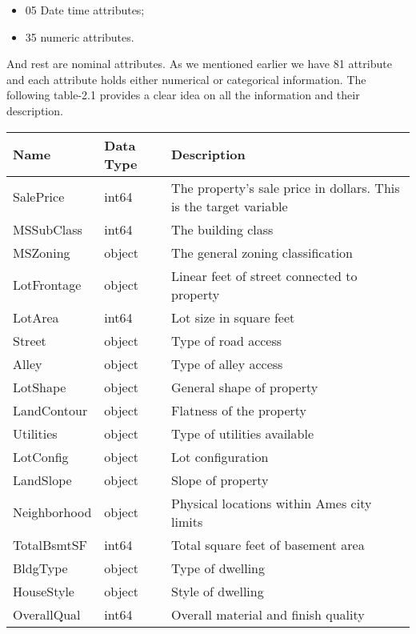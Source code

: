 \begin{itemize}
    \item 05 Date time attributes;
    \item 35 numeric attributes.
\end{itemize}
And rest are nominal attributes.
As we mentioned earlier we have 81 attribute and each attribute holds either numerical or categorical information. The following table-2.1 provides a clear idea on all the information and their description.

\begin{longtable}{|p{3cm}|p{3cm}|p{6.6cm}|}
\hline
\textbf{Name} & \textbf{Data Type} & \textbf{Description}                                             \\ \hline
SalePrice   & int64 & The property's sale price in dollars. This is the target variable \\ \hline
MSSubClass  & int64     & The building class \\ \hline
MSZoning    & object    & The general zoning classification \\ \hline
LotFrontage & object    & Linear feet of street connected to property \\ \hline
LotArea     & int64     & Lot size in square feet \\ \hline
Street      & object    & Type of road access \\ \hline
Alley       & object    & Type of alley access \\ \hline
LotShape    & object    & General shape of property \\ \hline
LandContour & object    & Flatness of the property \\ \hline
Utilities   & object    & Type of utilities available \\ \hline
LotConfig   & object    & Lot configuration \\ \hline
LandSlope   & object    & Slope of property \\ \hline
Neighborhood & object   & Physical locations within Ames city limits \\ \hline
TotalBsmtSF & int64     & Total square feet of basement area \\ \hline
BldgType    & object    & Type of dwelling \\ \hline
HouseStyle  & object    & Style of dwelling \\ \hline
OverallQual & int64     & Overall material and finish quality \\ \hline

\end{longtable}

